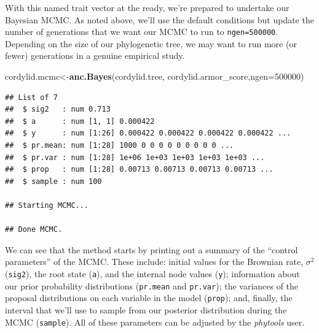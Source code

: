 \documentclass[fleqn,10pt,lineno]{wlpeerj} %
\newenvironment{Shaded}{\begin{snugshade}}{\end{snugshade}}
\newcommand{\AttributeTok}[1]{\textcolor[rgb]{0.13,0.29,0.53}{#1}}
\newcommand{\DecValTok}[1]{\textcolor[rgb]{0.00,0.00,0.81}{#1}}
\newcommand{\FunctionTok}[1]{\textcolor[rgb]{0.13,0.29,0.53}{\textbf{#1}}}
\newcommand{\NormalTok}[1]{#1}
\newcommand{\OtherTok}[1]{\textcolor[rgb]{0.56,0.35,0.01}{#1}}
\newcommand{\SpecialCharTok}[1]{\textcolor[rgb]{0.81,0.36,0.00}{\textbf{#1}}}
\begin{document}
\begin{Shaded}
\end{Shaded}

With this named trait vector at the ready, we're prepared to undertake our Bayesian MCMC. As noted above, we'll use the default conditions but update the number of generations that we want our MCMC to run to \texttt{ngen=500000}. Depending on the size of our phylogenetic tree, we may want to run more (or fewer) generations in a genuine empirical study.

\begin{Shaded}
\begin{Highlighting}[]
\NormalTok{cordylid.mcmc}\OtherTok{\textless{}{-}}\FunctionTok{anc.Bayes}\NormalTok{(cordylid.tree,}
\NormalTok{  cordylid.armor\_score,}\AttributeTok{ngen=}\DecValTok{500000}\NormalTok{)}
\end{Highlighting}
\end{Shaded}

\begin{verbatim}
## List of 7
##  $ sig2   : num 0.713
##  $ a      : num [1, 1] 0.000422
##  $ y      : num [1:26] 0.000422 0.000422 0.000422 0.000422 ...
##  $ pr.mean: num [1:28] 1000 0 0 0 0 0 0 0 0 0 ...
##  $ pr.var : num [1:28] 1e+06 1e+03 1e+03 1e+03 1e+03 ...
##  $ prop   : num [1:28] 0.00713 0.00713 0.00713 0.00713 ...
##  $ sample : num 100

## Starting MCMC...

## Done MCMC.
\end{verbatim}

We can see that the method starts by printing out a summary of the ``control parameters'' of the MCMC. These include: initial values for the Brownian rate, \(\sigma^{2}\) (\texttt{sig2}), the root state (\texttt{a}), and the internal node values (\texttt{y}); information about our prior probability distributions (\texttt{pr.mean} and \texttt{pr.var}); the variances of the proposal distributions on each variable in the model (\texttt{prop}); and, finally, the interval that we'll use to sample from our posterior distribution during the MCMC (\texttt{sample}). All of these parameters can be adjusted by the \emph{phytools} user.
\end{document}
